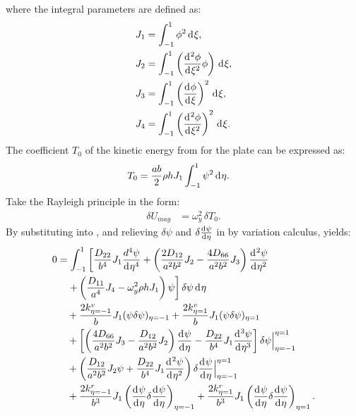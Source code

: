 \documentclass[preprint,12pt]{elsarticle}
\newcommand{\id}{\mathrm{d}\mkern1mu}
\begin{document}
%
where the integral parameters are defined as:  
%
\begin{equation}\label{eq:inte_psi}  
	\begin{split}  
		&J_1 = \int_{-1}^{1} \phi^2 \, \id\xi, \\  
		&J_2 = \int_{-1}^{1} \left( \frac{\id^2\phi}{\id\xi^2} \phi \right) \, \id\xi, \\  
		&J_3 = \int_{-1}^{1} \left( \frac{\id\phi}{\id\xi} \right)^2 \, \id\xi, \\  
		&J_4 = \int_{-1}^{1} \left( \frac{\id^2\phi}{\id\xi^2} \right)^2 \, \id\xi.  
	\end{split}  
\end{equation}  
%
The coefficient \( T_0 \) of the kinetic energy from  for the plate can be expressed as:
%
\begin{equation}\label{eq:kine_energyy}
	\begin{split}
		T_0 &= \frac{ab}{2} \rho h J_1 \int_{-1}^{1} \psi^2 \, \id\eta.
	\end{split}
\end{equation}
%
Take the Rayleigh principle in the form:
%
\begin{equation}\label{eq:Rayleighy}
	\begin{split}
		\delta U_{mag} &= \omega_y^2 \, \delta T_0.
	\end{split}
\end{equation}
%
By substituting  into , and relieving \( \delta \psi \) and \( \delta\frac{\id \psi}{\id \eta} \) in  by variation calculus, yields:
%
\begin{equation}\label{eq:Rayleighy2}
	\begin{split}
		0 &= \int_{-1}^{1} \left[ \frac{D_{22}}{b^4} J_1 \frac{d^4 \psi}{\id \eta^4} 
		+ \left( \frac{2D_{12}}{a^2b^2} J_2 - \frac{4D_{66}}{a^2b^2} J_3 \right) \frac{\id^2 \psi}{\id \eta^2} \right. \\
		&\quad \left. + \left( \frac{D_{11}}{a^4} J_4 - \omega_y^2 \rho h J_1 \right) \psi \right] \delta \psi \, \id\eta \\
		&\quad + \frac{2k^v_{\eta=-1}}{b} J_1 (\psi \delta \psi)_{\eta=-1} 
		+ \frac{2k^v_{\eta=1}}{b} J_1 (\psi \delta \psi)_{\eta=1} \\
		&\quad + \left[ \left( \frac{4D_{66}}{a^2b^2} J_3 - \frac{D_{12}}{a^2b^2} J_2 \right) \frac{\id \psi}{\id \eta} 
		- \frac{D_{22}}{b^4} J_1 \frac{\id^3 \psi}{\id \eta^3} \right] \delta \psi \Big|^{\eta=1}_{\eta=-1} \\
		&\quad + \left( \frac{D_{12}}{a^2b^2} J_2 \psi + \frac{D_{22}}{b^4} J_1 \frac{\id^2 \psi}{\id \eta^2} \right) 
		\delta\frac{\id  \psi}{\id \eta} \Big|^{\eta=1}_{\eta=-1} \\
		&\quad + \frac{2k^r_{\eta=-1}}{b^3} J_1 \left( \frac{\id \psi}{\id \eta} \delta\frac{\id \psi}{\id \eta} \right)_{\eta=-1} 
		+ \frac{2k^r_{\eta=1}}{b^3} J_1 \left( \frac{\id \psi}{\id \eta} \delta\frac{\id \psi}{\id \eta} \right)_{\eta=1}.
	\end{split}
\end{equation}
\end{document}
